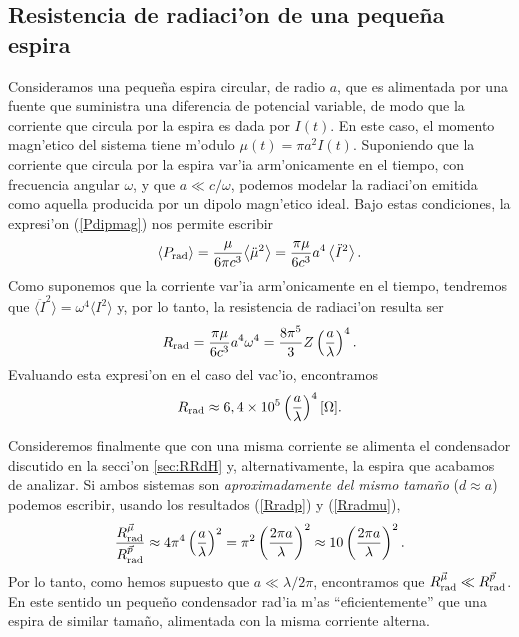 \subsection{Resistencia de radiaci'on de una pequeña espira}
Consideramos una pequeña espira circular, de radio $a$, que es alimentada por una fuente que suministra una diferencia de potencial variable, de modo que la corriente que circula por la espira es dada por $I(t)$. En este caso, el momento magn'etico del sistema tiene m'odulo $\mu(t)=\pi a^2I(t)$. Suponiendo que la corriente que circula por la espira var'ia arm'onicamente en el tiempo, con frecuencia angular $\omega$, y que $a\ll c/\omega$, podemos modelar la radiaci'on emitida como aquella producida por un dipolo magn'etico ideal. Bajo estas condiciones, la expresi'on (\ref{Pdipmag}) nos permite escribir
\begin{equation}
\left\langle P_{\rm rad}\right\rangle=\frac{\mu}{6\pi c^3}{\left\langle \ddot{\mu}^2\right\rangle}=\frac{\pi\mu}{6c^3}{a^4}\left\langle \ddot{I}^ 2\right\rangle .
\end{equation}
Como suponemos que la corriente var'ia arm'onicamente en el tiempo, tendremos que $\langle\ddot{I}^ 2\rangle=\omega^4\langle I^ 2\rangle$ y, por lo tanto, la resistencia de radiaci'on resulta ser
\begin{equation}
R_{\rm rad}=\frac{\pi\mu}{6c^3}{a^4\omega^4}
=\frac{8\pi^5}{3}Z\left(\frac{a}{\lambda}\right)^4.
\end{equation}
Evaluando esta expresi'on en el caso del vac'io, encontramos
\begin{equation}\label{Rradmu}
R_{\rm rad}\approx 6,4\times 10^{5}\left(\frac{a}{\lambda}\right)^4 [\Omega].
\end{equation}

Consideremos finalmente que con una misma corriente se alimenta el condensador discutido en la secci'on \ref{sec:RRdH} y, alternativamente, la espira que acabamos de analizar. Si ambos sistemas son \textit{aproximadamente del mismo tamaño} ($d\approx a$) podemos escribir, usando los resultados (\ref{Rradp}) y (\ref{Rradmu}), 
\begin{equation}
\frac{R_{\rm rad}^{\vec\mu}}{R_{\rm rad}^{\vec{p}}}\approx 4\pi^4\left(\frac{a}{\lambda}\right)^2=\pi^2\left(\frac{2\pi a}{\lambda}\right)^2\approx 10\left(\frac{2\pi a}{\lambda}\right)^2.
\end{equation}
Por lo tanto, como hemos supuesto que $a\ll\lambda/2\pi$, encontramos que  $R_{\rm rad}^{\vec\mu}\ll R_{\rm rad}^{\vec{p}}$. En este sentido un pequeño condensador rad'ia m'as ``eficientemente'' que una espira de similar tamaño, alimentada con la misma corriente alterna.


